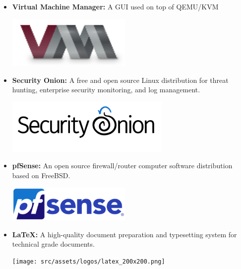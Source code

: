 \begin{itemize}
    \item \textbf{Virtual Machine Manager:} \newline \cite{kvm} A GUI used on top of QEMU/KVM \newline
          \begin{minipage}{\linewidth}
              \centering
              \includegraphics[width=6cm]{src/assets/logos/virt-manager.png}
          \end{minipage}
    \item \textbf{Security Onion:} \newline A free and open source Linux distribution for threat hunting, enterprise security monitoring, and log management. \newline
          \begin{minipage}{\linewidth}
              \centering
              \includegraphics[width=8cm]{src/assets/logos/security-onion-light.png}
          \end{minipage}
    \item \textbf{pfSense:} \newline An open source firewall/router computer software distribution based on FreeBSD. \newline
          \begin{minipage}{\linewidth}
              \centering
              \includegraphics[width=6cm]{src/assets/logos/pfSense-640px.png}
          \end{minipage}
    \item \textbf{LaTeX:} \newline \cite{latex-project} A high-quality document preparation and typesetting system for technical grade documents. \newline \newline
          \begin{minipage}{\linewidth}
              \centering
              \texttt{[image: src/assets/logos/latex\_200x200.png]}
          \end{minipage}

          \newpage
\end{itemize}

